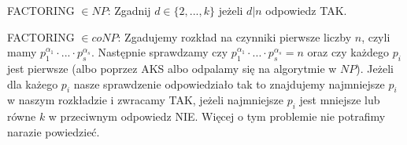 FACTORING $\in NP$: \newline
Zgadnij $d \in \{2,...,k\}$ jeżeli $d | n$ odpowiedz TAK.
\newline \newline

FACTORING $\in coNP$: \newline
Zgadujemy rozkład na czynniki pierwsze liczby $n$, czyli mamy $p_1^{\alpha_1}\cdot ... \cdot p_s^{\alpha_s}$. Następnie sprawdzamy czy $p_1^{\alpha_1}\cdot ... \cdot p_s^{\alpha_s} = n$ oraz czy każdego $p_i$ jest pierwsze (albo poprzez AKS albo odpalamy się na algorytmie w $NP$). Jeżeli dla każego $p_i$ nasze sprawdzenie odpowiedziało tak to znajdujemy najmniejsze $p_i$ w naszym rozkładzie i zwracamy TAK, jeżeli najmniejsze $p_i$ jest mniejsze lub równe $k$ w przeciwnym odpowiedz NIE.
\newline
Więcej o tym problemie nie potrafimy narazie powiedzieć.